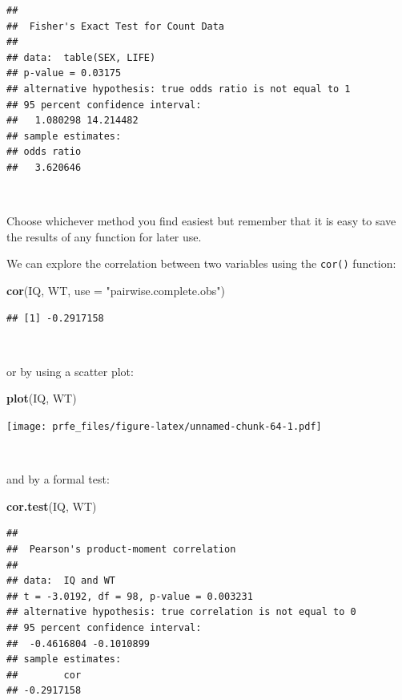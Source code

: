 \documentclass[12pt,a4paper]{book}
\newenvironment{Shaded}{\begin{snugshade}}{\end{snugshade}}
\newcommand{\KeywordTok}[1]{\textcolor[rgb]{0.13,0.29,0.53}{\textbf{#1}}}
\newcommand{\DataTypeTok}[1]{\textcolor[rgb]{0.13,0.29,0.53}{#1}}
\newcommand{\StringTok}[1]{\textcolor[rgb]{0.31,0.60,0.02}{#1}}
\newcommand{\NormalTok}[1]{#1}
\theoremstyle{definition}
\theoremstyle{definition}
\theoremstyle{definition}
\theoremstyle{remark}
\begin{document}
\begin{verbatim}
## 
##  Fisher's Exact Test for Count Data
## 
## data:  table(SEX, LIFE)
## p-value = 0.03175
## alternative hypothesis: true odds ratio is not equal to 1
## 95 percent confidence interval:
##   1.080298 14.214482
## sample estimates:
## odds ratio 
##   3.620646
\end{verbatim}

~

Choose whichever method you find easiest but remember that it is easy to
save the results of any function for later use.

We can explore the correlation between two variables using the
\texttt{cor()} function:

\begin{Shaded}
\begin{Highlighting}[]
\KeywordTok{cor}\NormalTok{(IQ, WT, }\DataTypeTok{use =} \StringTok{"pairwise.complete.obs"}\NormalTok{)}
\end{Highlighting}
\end{Shaded}

\begin{verbatim}
## [1] -0.2917158
\end{verbatim}

~

or by using a scatter plot:

\begin{Shaded}
\begin{Highlighting}[]
\KeywordTok{plot}\NormalTok{(IQ, WT)}
\end{Highlighting}
\end{Shaded}

\texttt{[image: prfe\_files/figure-latex/unnamed-chunk-64-1.pdf]}

~

and by a formal test:

\begin{Shaded}
\begin{Highlighting}[]
\KeywordTok{cor.test}\NormalTok{(IQ, WT)}
\end{Highlighting}
\end{Shaded}

\begin{verbatim}
## 
##  Pearson's product-moment correlation
## 
## data:  IQ and WT
## t = -3.0192, df = 98, p-value = 0.003231
## alternative hypothesis: true correlation is not equal to 0
## 95 percent confidence interval:
##  -0.4616804 -0.1010899
## sample estimates:
##        cor 
## -0.2917158
\end{verbatim}
\end{document}
